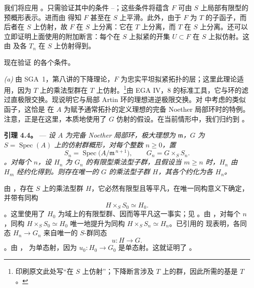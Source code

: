 我们将应用 。只需验证其中的条件 \textit{}--\textit{}；这些条件将蕴含 \(F\) 可由 \(S\) 上局部有限型的预概形表示。进而由  得知 \(F\) 甚至在 \(S\) 上平滑。此外，由于 \(F\) 为 \(T\) 的子函子，而后者在 \(S\) 上仿射，故 \(F\) 在 \(S\) 上分离：它在 \(T\) 上分离，而 \(T\) 在 \(S\) 上分离。还可以立即证明上面使用的附加断言：每个在 \(S\) 上拟紧的开集 \(U\subset F\) 在 \(S\) 上拟仿射。这由  及各 \(T_n\) 在 \(S\) 上仿射得到。

现在验证  的各个条件。

\smallskip\noindent{}\textit{(a)} 由 SGA~1，第八讲的下降理论，\(F\) 为忠实平坦拟紧拓扑的层；这里此理论适用，因为 \(T\) 上的乘法型群在 \(T\) 上仿射。\footnote{印刷原文此处写“在 \(S\) 上仿射”；下降断言涉及 \(T\) 上的群，因此所需的基是 \(T\)。}由 EGA IV，8 的标准工具，它与环的滤过直极限交换。现说明它与局部 Artin 环的理想进逆极限交换。对  中考虑的类似函子，这恰是  在 \(A\) 为赋予通常拓扑的定义理想的完备 Noether 局部环时的特例。注意，正是在这里，本质地使用了 \(G\) 仿射的假设。在当前情形中，我们归约到 。

\medskip\noindent{}\textbf{引理 4.4。} --- \textit{设 \(A\) 为完备 Noether 局部环，极大理想为 \(\mathfrak m\)，\(G\) 为 \(S=\operatorname{Spec}(A)\) 上的仿射群概形，对每个整数 \(n\geq0\)，置}  \[
  S_n=\operatorname{Spec}\bigl(A/\mathfrak m^{\,n+1}\bigr),
  \qquad
  G_n=G\times_SS_n.
\]\textit{。对每个 \(n\)，设 \(H_n\) 为 \(G_n\) 的有限型乘法型子群，且假设当 \(m\geq n\) 时，\(H_n\) 由 \(H_m\) 经约化得到。则存在唯一的 \(G\) 的乘法型子群 \(H\)，其各个约化为各 \(H_n\)。}

由 ，存在 \(S\) 上的乘法型群 \(H\)，它必然有限型且等平凡，在唯一同构意义下确定，并带有同构 \[
  H\times_SS_0\simeq H_0.
\]。这里使用了 \(H_0\) 为域上的有限型群、因而等平凡这一事实；见 。由 ，对每个 \(n\)，同构 \(H\times_SS_0\simeq H_0\) 唯一地提升为同构 \(H\times_SS_n\simeq H_n\)。已引用的  现表明，各同态 \(H_n\to G_n\) 来自唯一的 \(S\)-群同态  \[
  u\colon H\longrightarrow G.
\]。由 ， 为单态射，因为 \(u_0\colon H_0\to G_0\) 是单态射。这就证明了 。

